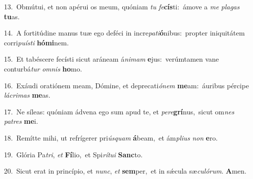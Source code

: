 {\numbfont\textcolor{\numbcolor}{13.}}~Obmútui, et non apérui os meum, quóniam \textit{tu} \textit{fe}\-\textbf{cís}ti:~\star ámove a \textit{me} \textit{pla}\-\textit{gas} \textbf{tu}\-as.\par
{\numbfont\textcolor{\numbcolor}{14.}}~A fortitúdine manus tuæ ego deféci in incre\-\textit{pa}\-\textit{ti}\textbf{ó}nibus:~\star propter iniquitátem corri\-\textit{pu}\-\textit{ís}\textit{ti} \textbf{hó}\-\textbf{mi}nem.\par
{\numbfont\textcolor{\numbcolor}{15.}}~Et tabéscere fecísti sicut aráneam á\-\textit{ni}\-\textit{mam} \textbf{e}\-jus:~\star verúmtamen vane conturbá\textit{tur} \textit{om}\-\textit{nis} \textbf{ho}\-mo.\par
{\numbfont\textcolor{\numbcolor}{16.}}~Exáudi oratiónem meam, Dómine, et deprecati\-\textit{ó}\-\textit{nem} \textbf{me}\-am:~\star áuribus pércipe \textit{lá}\-\textit{cri}\textit{mas} \textbf{me}\-as.\par
{\numbfont\textcolor{\numbcolor}{17.}}~Ne síleas: quóniam ádvena ego sum apud te, et \textit{per}\-\textit{e}\textbf{grí}nus,~\star sicut om\textit{nes} \textit{pa}\-\textit{tres} \textbf{me}\-i.\par
{\numbfont\textcolor{\numbcolor}{18.}}~Remítte mihi, ut refrígerer pri\-\textit{ús}\-\textit{quam} \textbf{á}\-beam,~\star et ám\-\textit{pli}\-\textit{us} \textit{non} \textbf{e}\-ro.\par
{\numbfont\textcolor{\numbcolor}{19.}}~Glória Pa\-\textit{tri}\-, \textit{et} \textbf{Fí}\-lio,~\star et Spi\-\textit{rí}\-\textit{tu}\textit{i} \textbf{Sanc}\-to.\par
{\numbfont\textcolor{\numbcolor}{20.}}~Sicut erat in princípio, et \textit{nunc}\-, \textit{et} \textbf{sem}\-per,~\star et in sǽcula sæ\-\textit{cu}\-\textit{ló}\textit{rum}. \textbf{A}\-men.\par
